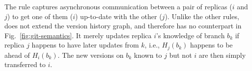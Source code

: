 The rule  captures asynchronous communication between
a pair of replicas ($i$ and $j$) to get one of them ($i$) up-to-date
with the other ($j$).  Unlike the other rules,  does
not extend the version history graph, and therefore has no counterpart
in Fig.~\ref{fig:git-semantics}. It merely updates replica $i$'s
knowledge of branch $b_k$ if replica $j$ happens to have later updates
from $k$, i.e., $H_j(b_k)$ happens to be ahead of $H_i(b_k)$. The new
versions on $b_k$ known to $j$ but not $i$ are then simply transferred
to $i$.


